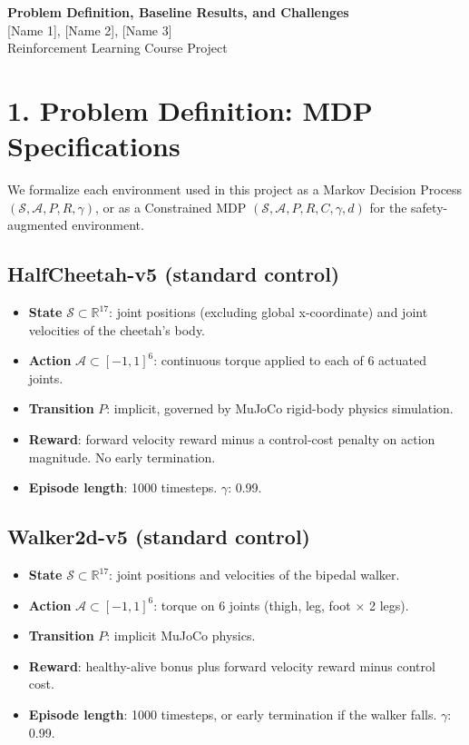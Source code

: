 \documentclass[10pt]{article}
\begin{document}
\begin{center}
{\Large \bfseries Problem Definition, Baseline Results, and Challenges}\\[4pt]
\normalsize [Name 1], [Name 2], [Name 3] \\
Reinforcement Learning Course Project
\end{center}

\section*{1. Problem Definition: MDP Specifications}

We formalize each environment used in this project as a Markov Decision Process $(\mathcal{S}, \mathcal{A}, P, R, \gamma)$, or as a Constrained MDP $(\mathcal{S}, \mathcal{A}, P, R, C, \gamma, d)$ for the safety-augmented environment.

\subsection*{HalfCheetah-v5 (standard control)}
\begin{itemize}[nosep, leftmargin=1.2em]
    \item \textbf{State} $\mathcal{S} \subset \mathbb{R}^{17}$: joint positions (excluding global x-coordinate) and joint velocities of the cheetah's body.
    \item \textbf{Action} $\mathcal{A} \subset [-1,1]^6$: continuous torque applied to each of 6 actuated joints.
    \item \textbf{Transition} $P$: implicit, governed by MuJoCo rigid-body physics simulation.
    \item \textbf{Reward}: forward velocity reward minus a control-cost penalty on action magnitude. No early termination.
    \item \textbf{Episode length}: 1000 timesteps. \quad \textbf{$\gamma$}: 0.99.
\end{itemize}

\subsection*{Walker2d-v5 (standard control)}
\begin{itemize}[nosep, leftmargin=1.2em]
    \item \textbf{State} $\mathcal{S} \subset \mathbb{R}^{17}$: joint positions and velocities of the bipedal walker.
    \item \textbf{Action} $\mathcal{A} \subset [-1,1]^6$: torque on 6 joints (thigh, leg, foot $\times$ 2 legs).
    \item \textbf{Transition} $P$: implicit MuJoCo physics.
    \item \textbf{Reward}: healthy-alive bonus plus forward velocity reward minus control cost.
    \item \textbf{Episode length}: 1000 timesteps, or early termination if the walker falls. \quad \textbf{$\gamma$}: 0.99.
\end{itemize}
\end{document}
